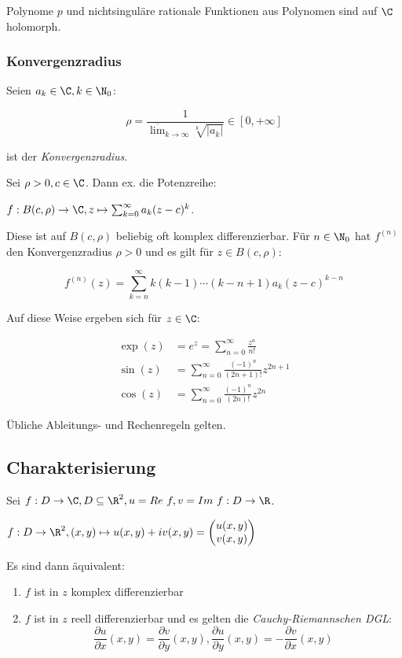 Polynome \(p\) und nichtsinguläre rationale Funktionen aus Polynomen sind auf \(\C\) holomorph.

\subsubsection*{Konvergenzradius}

Seien \(a_k \in \C, k \in \N_0\):

\vspace*{-2mm}
\[ \rho = \frac{1}{\overline\lim_{k\to\infty} \sqrt[k]{|a_k|}} \in [0,+\infty] \]

ist der \emph{Konvergenzradius}.

Sei \(\rho > 0, c \in \C\). Dann ex. die Potenzreihe:

	\(f : B(c,\rho) \to \C, z \mapsto \sum_{k=0}^\infty a_k(z-c)^k\).

Diese ist auf \(B(c,\rho)\) beliebig oft komplex differenzierbar. Für \(n \in \N_0\) hat \(f^{(n)}\) den Konvergenzradius \(\rho > 0\) und es gilt für \(z \in B(c,\rho)\):

\vspace*{-4mm}
\[ f^{(n)}(z) = \sum_{k=n}^\infty k(k-1)\cdots(k-n+1)a_k(z-c)^{k-n} \]

Auf diese Weise ergeben sich für \(z \in \C\):

\vspace*{-4mm}
\begin{align*}
	\exp(z) &= e^z = \sum_{n=0}^\infty \frac{z^n}{n!} \\
	\sin(z) &= \sum_{n=0}^\infty \frac{(-1)^n}{(2n+1)!} z^{2n+1} \\
	\cos(z) &= \sum_{n=0}^\infty \frac{(-1)^n}{(2n)!} z^{2n}
\end{align*}

Übliche Ableitungs- und Rechenregeln gelten.

\subsection*{Charakterisierung}

Sei \(f : D \to \C, D \subseteq \R^2, u = Re \ f, v = Im \ f : D \to \R\).

	\(f : D \to \R^2, (x,y) \mapsto u(x,y) + iv(x,y) = \begin{pmatrix} u(x,y) \\ v(x,y)\end{pmatrix}\)

Es sind dann äquivalent:

\begin{enumerate}[label=(\alph*)]
	\item \(f\) ist in \(z\) komplex differenzierbar
	\item \(f\) ist in \(z\) reell differenzierbar und es gelten die \emph{Cauchy-Riemannschen DGL}: \\
		\[ \frac{\partial u}{\partial x}(x,y) = \frac{\partial v}{\partial y}(x,y), \frac{\partial u}{\partial y}(x,y) = -\frac{\partial v}{\partial x}(x,y) \]
\end{enumerate}

